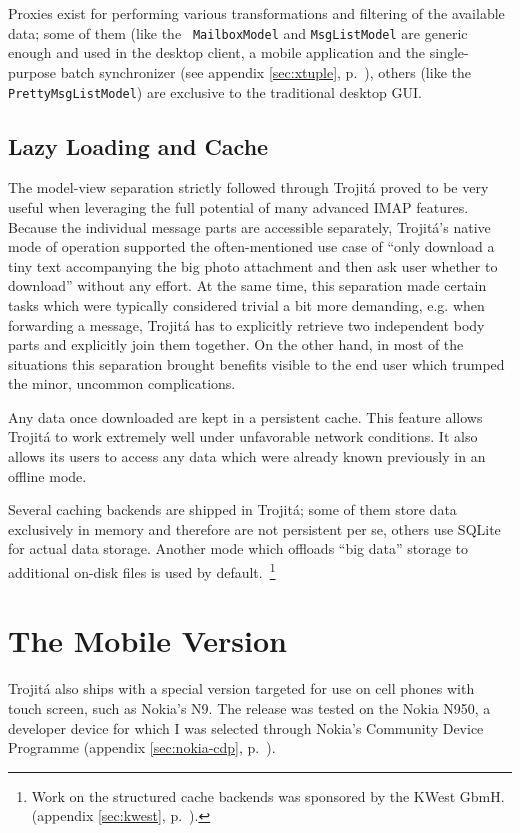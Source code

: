 \documentclass[trojita]{subfiles}
\begin{document}
Proxies exist for performing various transformations and filtering of the available data; some of them (like the {\tt
MailboxModel} and {\tt MsgListModel} are generic enough and used in the desktop client, a mobile application and the
single-purpose batch synchronizer (see appendix \ref{sec:xtuple}, p.~\pageref{sec:xtuple}), others (like the {\tt
PrettyMsgListModel}) are exclusive to the traditional desktop GUI.

\subsection{Lazy Loading and Cache}

The model-view separation strictly followed through Trojitá proved to be very useful when leveraging the full potential
of many advanced IMAP features.  Because the individual message parts are accessible separately, Trojitá's native mode
of operation supported the often-mentioned use case of ``only download a tiny text accompanying the big photo attachment
and then ask user whether to download'' without any effort.  At the same time, this separation made certain tasks which
were typically considered trivial a bit more demanding, e.g. when forwarding a message, Trojitá has to explicitly
retrieve two independent body parts and explicitly join them together.  On the other hand, in most of the situations
this separation brought benefits visible to the end user which trumped the minor, uncommon complications.

Any data once downloaded are kept in a persistent cache.  This feature allows Trojitá to work extremely well under
unfavorable network conditions.  It also allows its users to access any data which were already known previously in an
offline mode.

Several caching backends are shipped in Trojitá; some of them store data exclusively in memory and therefore are not
persistent per se, others use SQLite \cite{sqlite} for actual data storage.  Another mode which offloads ``big data''
storage to additional on-disk files is used by default.~\footnote{Work on the structured cache backends was sponsored by
the KWest GbmH. (appendix \ref{sec:kwest}, p.~\pageref{sec:kwest}).}

\section{The Mobile Version}

Trojitá also ships with a special version targeted for use on cell phones with touch screen, such as Nokia's N9.  The
release was tested on the Nokia N950, a developer device for which I was selected through Nokia's Community Device
Programme (appendix \ref{sec:nokia-cdp}, p.~\pageref{sec:nokia-cdp}).
\end{document}
